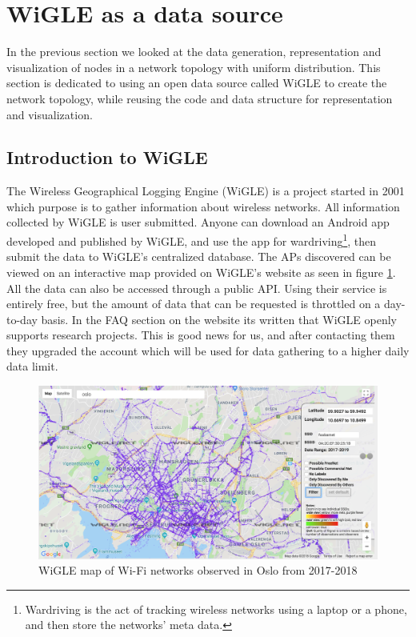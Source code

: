 \section{WiGLE as a data source}
\label{chap:wigle}
In the previous section we looked at the data generation, representation and visualization of nodes in a network topology with uniform distribution. This section is dedicated
to using an open data source called WiGLE to create the network topology, while reusing the code and data structure for representation and visualization. 

\subsection{Introduction to WiGLE}
The Wireless Geographical Logging Engine (WiGLE) \cite{wigle} is a project started in 2001 which purpose is to gather information about wireless networks.
All information collected by WiGLE is user submitted. Anyone can download an Android app developed and published by WiGLE, and use the app for wardriving\footnote{Wardriving is the act of tracking wireless networks using a laptop or a phone, and then store the networks' meta data.},
then submit the data to WiGLE's centralized database. The APs discovered can be viewed on an interactive map provided on WiGLE's website as seen in figure \ref{fig:wigfig}.
All the data can also be accessed through a public API. Using their service is entirely free, but the amount of data that can be requested is throttled on a day-to-day basis.
In the FAQ section on the website its written that WiGLE openly supports research projects. This is good news for us, and after contacting them they upgraded the account which will be used
for data gathering to a higher daily data limit. 

\begin{figure}[h]
	\center
	\includegraphics[scale=0.35]{Images/wigle.png}
	\caption{WiGLE map of Wi-Fi networks observed in Oslo from 2017-2018}
	\label{fig:wigfig}
\end{figure}

